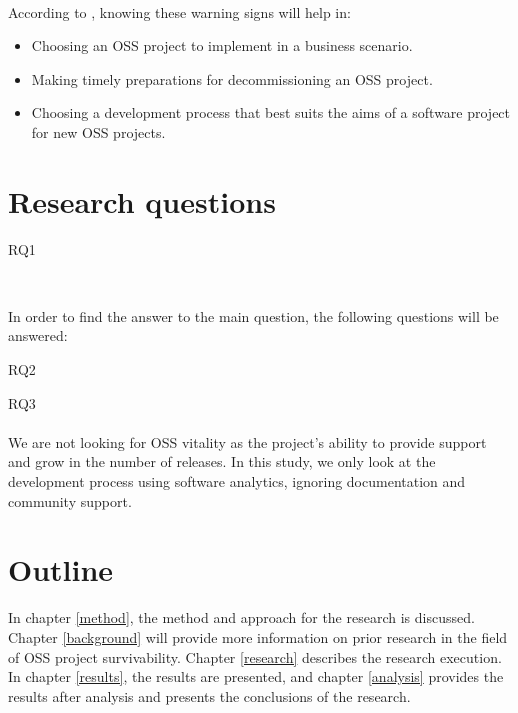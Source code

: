 \paragraph{}
According to \citet{karus2013}, knowing these warning signs will help in:
\begin{itemize}
	\item Choosing an OSS project to implement in a business scenario.
	\item Making timely preparations for decommissioning an OSS project.
	\item Choosing a development process that best suits the aims of a software
	project for new OSS projects.
\end{itemize}




\section{Research questions}
\label{questions}

\begin{description}
	\item[RQ1\label{itm:question_warningsigns}]
	\emph{\researchQuestion}\\[0.3cm]
\end{description}

\noindent
In order to find the answer to the main question, the following
questions will be answered:
\begin{description}
	\item[RQ2\label{itm:question_patterns}] \emph{\subQuestionOne}
	\item[RQ3\label{itm:question_successfailure}] \emph{\subQuestionTwo}
\end{description}

\paragraph{}
We are not looking for OSS vitality as the project's ability to provide support
and grow in the number of releases. In this study, we only look at the
development process using software analytics, ignoring documentation and
community support.



\section{Outline}

In chapter \ref{method}, the method and approach for the research is discussed.
Chapter \ref{background} will provide more information on prior research in the
field of OSS project survivability. Chapter \ref{research} describes the
research execution. In chapter \ref{results}, the results are presented, and
chapter \ref{analysis} provides the results after analysis and presents the
conclusions of the research.

